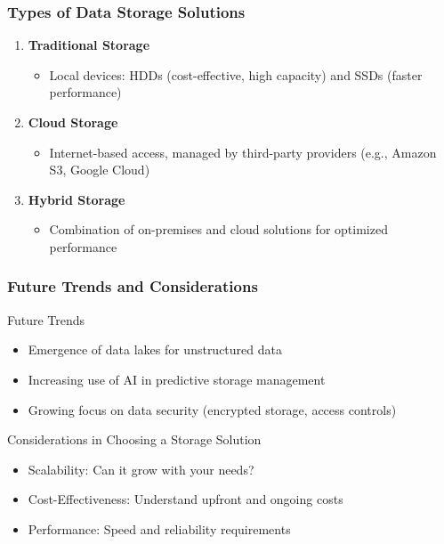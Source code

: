 \documentclass[aspectratio=169]{beamer}
\begin{document}
\begin{frame}[fragile]
    \frametitle{Types of Data Storage Solutions}
    \begin{enumerate}
        \item \textbf{Traditional Storage}
            \begin{itemize}
                \item Local devices: HDDs (cost-effective, high capacity) and SSDs (faster performance)
            \end{itemize}
        \item \textbf{Cloud Storage}
            \begin{itemize}
                \item Internet-based access, managed by third-party providers (e.g., Amazon S3, Google Cloud)
            \end{itemize}
        \item \textbf{Hybrid Storage}
            \begin{itemize}
                \item Combination of on-premises and cloud solutions for optimized performance
            \end{itemize}
    \end{enumerate}
\end{frame}

\begin{frame}[fragile]
    \frametitle{Future Trends and Considerations}
    \begin{block}{Future Trends}
        \begin{itemize}
            \item Emergence of data lakes for unstructured data
            \item Increasing use of AI in predictive storage management
            \item Growing focus on data security (encrypted storage, access controls)
        \end{itemize}
    \end{block}

    \begin{block}{Considerations in Choosing a Storage Solution}
        \begin{itemize}
            \item Scalability: Can it grow with your needs?
            \item Cost-Effectiveness: Understand upfront and ongoing costs
            \item Performance: Speed and reliability requirements
        \end{itemize}
    \end{block}
\end{frame}
\end{document}
